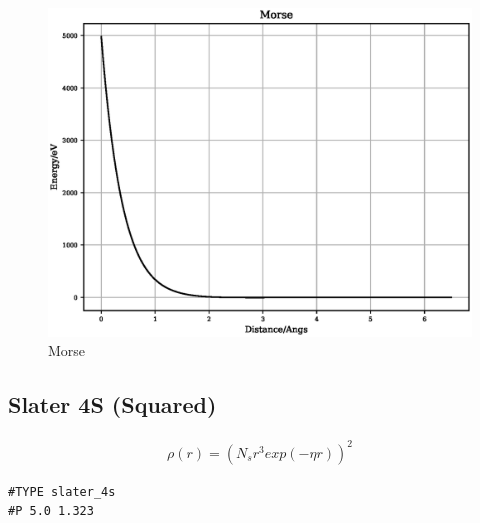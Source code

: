\FloatBarrier
\begin{figure}[h]
  \begin{center}
    \includegraphics[scale=0.5]{appendix/functions/plots/morse.eps}
    \caption{Morse}
    \label{graph:graph1}
  \end{center}
\end{figure}
\FloatBarrier







\subsection{Slater 4S (Squared)}

\begin{equation}
\begin{split}
\rho(r) = (N_s r^3 exp(-\eta r))^2 
\end{split}
\label{eq:slater4S}
\end{equation}

\begin{lstlisting}[style=pseudocode,caption={Slater 4S}]
#TYPE slater_4s
#P 5.0 1.323
\end{lstlisting}


